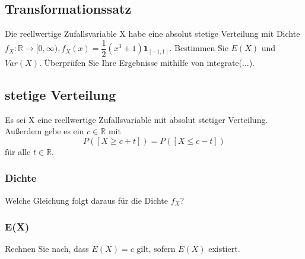 \documentclass[paper=a4, fontsize=11pt]{scrartcl}
\numberwithin{equation}{section}
\numberwithin{figure}{section}
\numberwithin{table}{section}
\begin{document}
\subsection{Transformationssatz}
Die reellwertige Zufallsvariable X habe eine absolut stetige Verteilung mit Dichte $f_{X}: \mathbb{R} \rightarrow [0, \infty), f_{X}(x)= \dfrac{1}{2}(x^{3}+1) \textbf{1} _{[-1,1]}$. Bestimmen Sie $E(X)$ und $Var(X)$. Überprüfen Sie Ihre Ergebnisse mithilfe von integrate(...). \\

\subsection{stetige Verteilung}
Es sei X eine reellwertige Zufallsvariable mit absolut stetiger Verteilung. Außerdem gebe es ein $c \in \mathbb{R}$ mit
$$P([X \geq c+t]) = P([X \leq c-t])$$
für alle $t \in \mathbb{R}$. 

\subsubsection{Dichte}
Welche Gleichung folgt daraus für die Dichte $f_{X}$? \\

\subsubsection{E(X)}
Rechnen Sie nach, dass $E(X)=c$ gilt, sofern $E(X)$ existiert. \\

\end{document}
